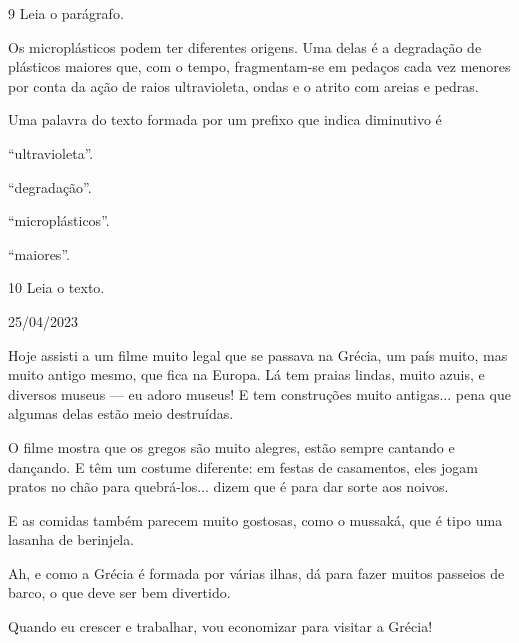 \num{9} Leia o parágrafo.

\begin{myquote}
Os microplásticos podem ter diferentes origens. Uma delas é a degradação
de plásticos maiores que, com o tempo, fragmentam-se em pedaços cada vez
menores por conta da ação de raios ultravioleta, ondas e o atrito com
areias e pedras.

\end{myquote}

Uma palavra do texto formada por um prefixo que indica diminutivo é

\begin{escolha}
\item ``ultravioleta''.

\item ``degradação''.

\item ``microplásticos''.

\item ``maiores''.
\end{escolha}


\num{10} Leia o texto.

\begin{myquote}
25/04/2023

Hoje assisti a um filme muito legal que se passava na Grécia, um país
muito, mas muito antigo mesmo, que fica na Europa. Lá tem praias lindas,
muito azuis, e diversos museus --- eu adoro museus! E tem
construções muito antigas... pena que algumas delas estão meio
destruídas.

O filme mostra que os gregos são muito alegres, estão sempre cantando e
dançando. E têm um costume diferente: em festas de casamentos, eles
jogam pratos no chão para quebrá-los... dizem que é para dar sorte aos
noivos.

E as comidas também parecem muito gostosas, como o mussaká, que é tipo
uma lasanha de berinjela.

Ah, e como a Grécia é formada por várias ilhas, dá para fazer muitos
passeios de barco, o que deve ser bem divertido.

Quando eu crescer e trabalhar, vou economizar para visitar a Grécia!

\end{myquote}

